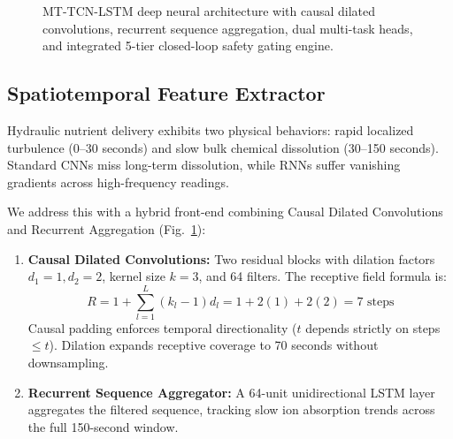 \documentclass[conference]{IEEEtran}
\begin{document}
\begin{figure}[t]
{
}
\caption{MT-TCN-LSTM deep neural architecture with causal dilated convolutions, recurrent sequence aggregation, dual multi-task heads, and integrated 5-tier closed-loop safety gating engine.}
\label{fig:architecture}
\end{figure}

\subsection{Spatiotemporal Feature Extractor}
Hydraulic nutrient delivery exhibits two physical behaviors: rapid localized turbulence (0--30 seconds) and slow bulk chemical dissolution (30--150 seconds). Standard CNNs miss long-term dissolution, while RNNs suffer vanishing gradients across high-frequency readings.

We address this with a hybrid front-end combining Causal Dilated Convolutions and Recurrent Aggregation (Fig.~\ref{fig:architecture}):
\begin{enumerate}
    \item \textbf{Causal Dilated Convolutions:} Two residual blocks with dilation factors $d_1=1, d_2=2$, kernel size $k=3$, and 64 filters. The receptive field formula is:
    \begin{equation}
    R = 1 + \sum_{l=1}^L (k_l - 1) d_l = 1 + 2(1) + 2(2) = 7 \text{ steps}
    \end{equation}
    Causal padding enforces temporal directionality ($t$ depends strictly on steps $\le t$). Dilation expands receptive coverage to 70 seconds without downsampling.
    \item \textbf{Recurrent Sequence Aggregator:} A 64-unit unidirectional LSTM layer aggregates the filtered sequence, tracking slow ion absorption trends across the full 150-second window.
\end{enumerate}
\end{document}
